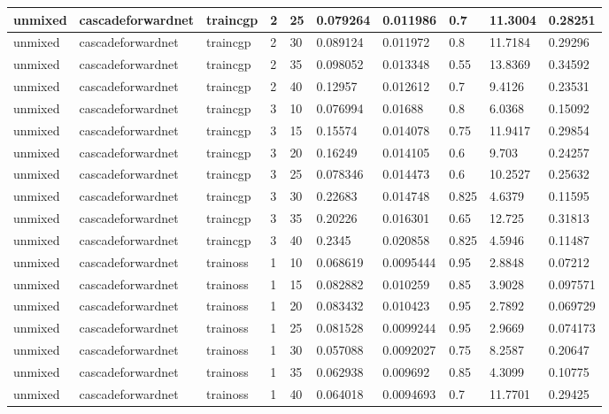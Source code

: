 \begin{longtable}{lllllllll}
unmixed & cascadeforwardnet & traincgp & 2 & 25 & 0.079264 & 0.011986 & 0.7 & 11.3004 & 0.28251 \\ \hline 
unmixed & cascadeforwardnet & traincgp & 2 & 30 & 0.089124 & 0.011972 & 0.8 & 11.7184 & 0.29296 \\ \hline 
unmixed & cascadeforwardnet & traincgp & 2 & 35 & 0.098052 & 0.013348 & 0.55 & 13.8369 & 0.34592 \\ \hline 
unmixed & cascadeforwardnet & traincgp & 2 & 40 & 0.12957 & 0.012612 & 0.7 & 9.4126 & 0.23531 \\ \hline 
unmixed & cascadeforwardnet & traincgp & 3 & 10 & 0.076994 & 0.01688 & 0.8 & 6.0368 & 0.15092 \\ \hline 
unmixed & cascadeforwardnet & traincgp & 3 & 15 & 0.15574 & 0.014078 & 0.75 & 11.9417 & 0.29854 \\ \hline 
unmixed & cascadeforwardnet & traincgp & 3 & 20 & 0.16249 & 0.014105 & 0.6 & 9.703 & 0.24257 \\ \hline 
unmixed & cascadeforwardnet & traincgp & 3 & 25 & 0.078346 & 0.014473 & 0.6 & 10.2527 & 0.25632 \\ \hline 
unmixed & cascadeforwardnet & traincgp & 3 & 30 & 0.22683 & 0.014748 & 0.825 & 4.6379 & 0.11595 \\ \hline 
unmixed & cascadeforwardnet & traincgp & 3 & 35 & 0.20226 & 0.016301 & 0.65 & 12.725 & 0.31813 \\ \hline 
unmixed & cascadeforwardnet & traincgp & 3 & 40 & 0.2345 & 0.020858 & 0.825 & 4.5946 & 0.11487 \\ \hline 
unmixed & cascadeforwardnet & trainoss & 1 & 10 & 0.068619 & 0.0095444 & 0.95 & 2.8848 & 0.07212 \\ \hline 
unmixed & cascadeforwardnet & trainoss & 1 & 15 & 0.082882 & 0.010259 & 0.85 & 3.9028 & 0.097571 \\ \hline 
unmixed & cascadeforwardnet & trainoss & 1 & 20 & 0.083432 & 0.010423 & 0.95 & 2.7892 & 0.069729 \\ \hline 
unmixed & cascadeforwardnet & trainoss & 1 & 25 & 0.081528 & 0.0099244 & 0.95 & 2.9669 & 0.074173 \\ \hline 
unmixed & cascadeforwardnet & trainoss & 1 & 30 & 0.057088 & 0.0092027 & 0.75 & 8.2587 & 0.20647 \\ \hline 
unmixed & cascadeforwardnet & trainoss & 1 & 35 & 0.062938 & 0.009692 & 0.85 & 4.3099 & 0.10775 \\ \hline 
unmixed & cascadeforwardnet & trainoss & 1 & 40 & 0.064018 & 0.0094693 & 0.7 & 11.7701 & 0.29425 \\ \hline 

\end{longtable}
